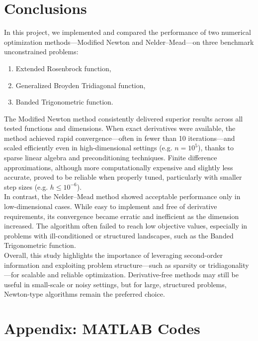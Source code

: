 \documentclass[a4paper,12pt]{article}
\begin{document}
	
	\section{Conclusions}
	
	In this project, we implemented and compared the performance of two numerical optimization methods—Modified Newton and Nelder–Mead—on three benchmark unconstrained problems:
	\begin{enumerate}
	\item Extended Rosenbrock function,
	\item Generalized Broyden Tridiagonal function,
	\item Banded Trigonometric function.
	\end{enumerate}
	
	The Modified Newton method consistently delivered superior results across all tested functions and dimensions. When exact derivatives were available, the method achieved rapid convergence—often in fewer than 10 iterations—and scaled efficiently even in high-dimensional settings (e.g. $n = 10^5$), thanks to sparse linear algebra and preconditioning techniques. Finite difference approximations, although more computationally expensive and slightly less accurate, proved to be reliable when properly tuned, particularly with smaller step sizes (e.g. $h \leq 10^{-6}$).\\
	
	In contrast, the Nelder–Mead method showed acceptable performance only in low-dimensional cases. While easy to implement and free of derivative requirements, its convergence became erratic and inefficient as the dimension increased. The algorithm often failed to reach low objective values, especially in problems with ill-conditioned or structured landscapes, such as the Banded Trigonometric function.\\
	
	Overall, this study highlights the importance of leveraging second-order information and exploiting problem structure—such as sparsity or tridiagonality—for scalable and reliable optimization. Derivative-free methods may still be useful in small-scale or noisy settings, but for large, structured problems, Newton-type algorithms remain the preferred choice.
	
	\newpage
	\appendix
	\section*{Appendix: MATLAB Codes}
	
\end{document}
